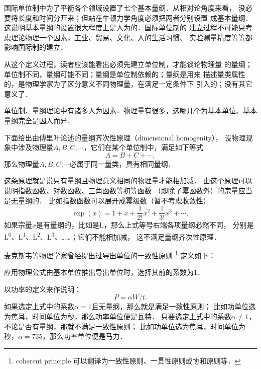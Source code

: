 \vspace{1ex}

\begin{remark}
    国际单位制中为了平衡各个领域设置了七个基本量纲．从相对论角度来看，
    没必要将长度和时间分开来；但站在牛顿力学角度必须把两者分别设置
    成基本量纲．这说明基本量纲的设置很大程度上是人为的．国际单位制的
    建立过程不可能只考虑理论物理一个因素，工业、贸易、文化、人的生活习惯、
    实验测量精度等等都影响国际制的建立．

    从这个定义过程，读者应该能看出必须先建立单位制，才能谈论物理量
    的量纲；单位制不同，量纲可能不同；量纲是单位制依赖的；量纲是用来
    描述量类属性的，是物理学家为了区分意义不同物理量，在满足一定条件下
    引入的；没有其它意义了．
\end{remark}

\begin{remark}
    单位制、量纲理论中有诸多人为因素．物理量有很多，选哪几个为基本单位、基本量纲完全是因人而异．
\end{remark}

下面给出由傅里叶论述的{\heiti 量纲齐次性原理}（dimensional  homogenity），
设物理现象中涉及物理量$A,B,C,\cdots$，它们在某个单位制中，满足如下等式
    \begin{equation}
        A=B+C+\cdots ,
    \end{equation}
那么物理量$A,B,C,\cdots$必属于同一量类，具有相同量纲．

这条原理就是说只有量纲且物理意义相同的物理量才能相加减．
由这个原理可以说明指数函数、对数函数、三角函数等初等函数
（即除了幂函数外）的宗量应当是无量纲的．
比如指数函数可以展开成幂级数（暂不考虑收敛性）
\begin{equation*}
    \exp(x) = 1 + x + \frac{1}{2 !}x^2 + \frac{1}{3 !}x^3 + \cdots,
\end{equation*}
如果宗量$x$是有量纲的，比如是\si{L}，那么上式等号右端各项量纲必然不同，
分别是\si{L^0}、\si{L^1}、\si{L^2}、\si{L^3}、……；它们不能相加减，
这不满足量纲齐次性原理．

麦克斯韦等物理学家曾经提出过导出单位的{\heiti 一致性原则}
{\footnote{coherent principle 可以翻译为一致性原则、一贯性原则或协和原则等．}}
定义如下：
\begin{definition}
    应用物理公式由基本单位推出导出单位时，选择其前的系数为1．
\end{definition}
以功率的定义来作说明：
\begin{equation*}
    P=\alpha W/t .
\end{equation*}
如果选定上式中的系数$\alpha=1$且无量纲，那么就是满足一致性原则；
比如功单位选为焦耳，时间单位为秒，那么功率单位便是瓦特．
只要选定上式中的系数$\alpha\neq 1$，不论是否有量纲，那就不满足一致性原则；
比如功单位选为焦耳，时间单位为秒，$\alpha=735$，那么功率单位便是马力．


